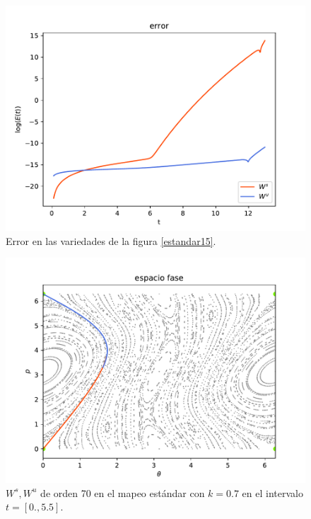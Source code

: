 \begin{figure}[H]
	\centering
	\includegraphics[scale=0.7]{errork15} 
	\caption{Error en las variedades de la figura \ref{estandar15}.}
	\label{error est k15}
\end{figure}




\begin{figure}[H]
	\centering
	\includegraphics[scale=0.7]{k07}
	\caption{$W^{s},W^{u}$ de orden 70 en el mapeo estándar con $k=0.7$ en el intervalo $t=[0.,5.5]$.}
	\label{estandar07}
\end{figure}

